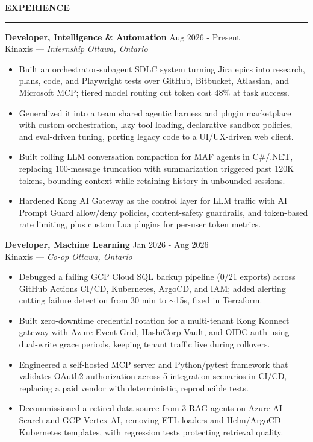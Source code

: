 \documentclass{resume}
\newcommand{\ats}[2]{\BeginAccSupp{method=pdfstringdef,ActualText={#2}}#1\EndAccSupp{}}
\newcommand{\bulletgap}{-3pt}   %
\newcommand{\headergap}{-3pt}   %
\def\sectionskip{\vspace{12pt}}     %
\renewenvironment{rSection}[1]{%
  \sectionskip
  {\large\bfseries\MakeUppercase{#1}}%
  \sectionlineskip
  \hrule
  \begin{list}{}{\setlength{\leftmargin}{0em}}
  \item[]
}{%
  \end{list}
  \vspace{-0.5em}
}
\begin{document}
\begin{rSection}{Experience}


\textbf{Developer, Intelligence \& Automation} \hfill Aug 2026 - Present\\
Kinaxis --- \textit{Internship} \hfill \textit{Ottawa, Ontario}%
\vspace{\headergap}
\begin{itemize}[leftmargin=0.15in]
    \itemsep \bulletgap {}
    \item Built an orchestrator-subagent SDLC system turning Jira epics into research, plans, code, and Playwright tests over GitHub, Bitbucket, Atlassian, and Microsoft MCP; tiered model routing cut token cost 48\% at task success.
    \item Generalized it into a team shared agentic harness and plugin marketplace with custom orchestration, lazy tool loading, declarative sandbox policies, and eval-driven tuning, porting legacy code to a UI/UX-driven web client.
    \item Built rolling LLM conversation compaction for MAF agents in C\#/.NET, replacing 100-message truncation with summarization triggered past 120K tokens, bounding context while retaining history in unbounded sessions.
    \item Hardened Kong AI Gateway as the control layer for LLM traffic with AI Prompt Guard allow/deny policies, content-safety guardrails, and token-based rate limiting, plus custom Lua plugins for per-user token metrics.
\end{itemize}

\textbf{Developer, Machine Learning} \hfill Jan 2026 - Aug 2026\\
Kinaxis --- \textit{Co-op} \hfill \textit{Ottawa, Ontario}%
\vspace{\headergap}
\vspace{\headergap}
\begin{itemize}[leftmargin=0.15in]
    \itemsep \bulletgap {}
    \item Debugged a failing GCP Cloud SQL backup pipeline (0/21 exports) across GitHub Actions CI/CD, Kubernetes, ArgoCD, and IAM; added alerting cutting failure detection from 30 min to \ats{$\sim$}{\textasciitilde}15s, fixed in Terraform.
    \item Built zero-downtime credential rotation for a multi-tenant Kong Konnect gateway with Azure Event Grid, HashiCorp Vault, and OIDC auth using dual-write grace periods, keeping tenant traffic live during rollovers.
    \item Engineered a self-hosted MCP server and Python/pytest framework that validates OAuth2 authorization across 5 integration scenarios in CI/CD, replacing a paid vendor with deterministic, reproducible tests.
    \item Decommissioned a retired data source from 3 RAG agents on Azure AI Search and GCP Vertex AI, removing ETL loaders and Helm/ArgoCD Kubernetes templates, with regression tests protecting retrieval quality.
\end{itemize}


\end{rSection}
\end{document}

